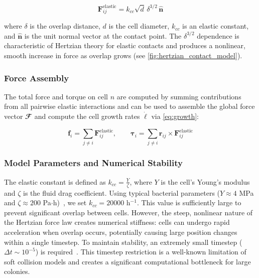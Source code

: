 \documentclass[conference]{IEEEtran}
\begin{document}
\begin{equation} \label{eq:hertzian_contact_model}
    \mathbf{F}^{\text{elastic}}_{ij} = k_{cc} \sqrt{d} \, \delta^{3/2} \, \hat{\mathbf{n}}
\end{equation}

where $\delta$ is the overlap distance, $d$ is the cell diameter, $k_{cc}$ is an elastic constant, and $\hat{\mathbf{n}}$ is the unit normal vector at the contact point. The $\delta^{3/2}$ dependence is characteristic of Hertzian theory for elastic contacts and produces a nonlinear, smooth increase in force as overlap grows (see \autoref{fig:hertzian_contact_model}).

\subsubsection{Force Assembly}

The total force and torque on cell $n$ are computed by summing contributions from all pairwise elastic interactions and can be used to assemble the global force vector $\mathbfcal{F}$ and compute the cell growth rates $\dot{\boldsymbol{\ell}}$ via \autoref{eq:growth}:

\begin{equation} \label{eq:force_assembly}
    \mathbf{f}_i         = \sum_{j \neq i} \mathbf{F}^{\text{elastic}}_{ij}, \qquad
    \boldsymbol{\tau}_i  = \sum_{j \neq i} \mathbf{r}_{ij} \times \mathbf{F}^{\text{elastic}}_{ij}
\end{equation}

\subsubsection{Model Parameters and Numerical Stability}

The elastic constant is defined as $k_{cc} = \frac{Y}{\zeta}$, where $Y$ is the cell's Young's modulus and $\zeta$ is the fluid drag coefficient. Using typical bacterial parameters ($Y \approx 4$ MPa and $\zeta \approx 200$ Pa$\cdot$h)~\cite{You2018, Blanchard2015}, we set $k_{cc} = 20000$ h$^{-1}$. This value is sufficiently large to prevent significant overlap between cells. However, the steep, nonlinear nature of the Hertzian force law creates numerical stiffness: cells can undergo rapid acceleration when overlap occurs, potentially causing large position changes within a single timestep. To maintain stability, an extremely small timestep ($\Delta t \sim 10^{-5}$) is required~\cite{Khan_2024, You2018, Blanchard2015}. This timestep restriction is a well-known limitation of soft collision models and creates a significant computational bottleneck for large colonies.
\end{document}
